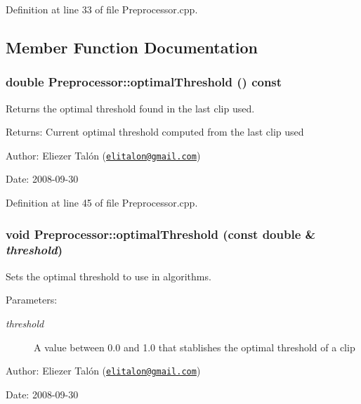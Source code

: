 Definition at line 33 of file Preprocessor.cpp.

\subsection{Member Function Documentation}
\hypertarget{class_preprocessor_8cc19d799c87198f97356d41606aa4ac}{
\subsubsection[optimalThreshold]{\setlength{\rightskip}{0pt plus 5cm}double Preprocessor::optimalThreshold () const}}
\label{class_preprocessor_8cc19d799c87198f97356d41606aa4ac}


Returns the optimal threshold found in the last clip used. 

\begin{Desc}
\item[Returns:]Current optimal threshold computed from the last clip used\end{Desc}
\begin{Desc}
\item[Author:]Eliezer Talón (\href{mailto:elitalon@gmail.com}{\tt elitalon@gmail.com}) \end{Desc}
\begin{Desc}
\item[Date:]2008-09-30 \end{Desc}


Definition at line 45 of file Preprocessor.cpp.\hypertarget{class_preprocessor_50f1344cfbab71e64512c994ea4e3a03}{
\subsubsection[optimalThreshold]{\setlength{\rightskip}{0pt plus 5cm}void Preprocessor::optimalThreshold (const double \& {\em threshold})}}
\label{class_preprocessor_50f1344cfbab71e64512c994ea4e3a03}


Sets the optimal threshold to use in algorithms. 

\begin{Desc}
\item[Parameters:]
\begin{description}
\item[{\em threshold}]A value between 0.0 and 1.0 that stablishes the optimal threshold of a clip\end{description}
\end{Desc}
\begin{Desc}
\item[Author:]Eliezer Talón (\href{mailto:elitalon@gmail.com}{\tt elitalon@gmail.com}) \end{Desc}
\begin{Desc}
\item[Date:]2008-09-30 \end{Desc}


